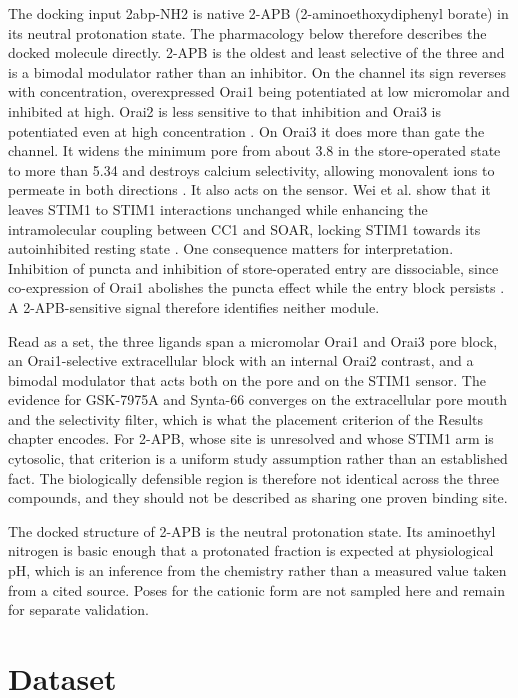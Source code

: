 The docking input 2abp-NH2 is native 2-APB (2-aminoethoxydiphenyl borate) in its neutral protonation state. The pharmacology below therefore describes the docked molecule directly. 2-APB is the oldest and least selective of the three and is a bimodal modulator rather than an inhibitor. On the channel its sign reverses with concentration, overexpressed Orai1 being potentiated at low micromolar and inhibited at high. Orai2 is less sensitive to that inhibition and Orai3 is potentiated even at high concentration \cite{ref070}. On Orai3 it does more than gate the channel. It widens the minimum pore from about 3.8\angstrom{} in the store-operated state to more than 5.34\angstrom{} and destroys calcium selectivity, allowing monovalent ions to permeate in both directions \cite{ref092}. It also acts on the sensor. Wei et al. show that it leaves STIM1 to STIM1 interactions unchanged while enhancing the intramolecular coupling between CC1 and SOAR, locking STIM1 towards its autoinhibited resting state \cite{ref040}. One consequence matters for interpretation. Inhibition of puncta and inhibition of store-operated entry are dissociable, since co-expression of Orai1 abolishes the puncta effect while the entry block persists \cite{ref040}. A 2-APB-sensitive signal therefore identifies neither module.

Read as a set, the three ligands span a micromolar Orai1 and Orai3 pore block, an Orai1-selective extracellular block with an internal Orai2 contrast, and a bimodal modulator that acts both on the pore and on the STIM1 sensor. The evidence for GSK-7975A and Synta-66 converges on the extracellular pore mouth and the selectivity filter, which is what the placement criterion of the Results chapter encodes. For 2-APB, whose site is unresolved and whose STIM1 arm is cytosolic, that criterion is a uniform study assumption rather than an established fact. The biologically defensible region is therefore not identical across the three compounds, and they should not be described as sharing one proven binding site.

The docked structure of 2-APB is the neutral protonation state. Its aminoethyl nitrogen is basic enough that a protonated fraction is expected at physiological pH, which is an inference from the chemistry rather than a measured value taken from a cited source. Poses for the cationic form are not sampled here and remain for separate validation.

\hypertarget{dataset}{%
\chapter{Dataset}\label{dataset}}

